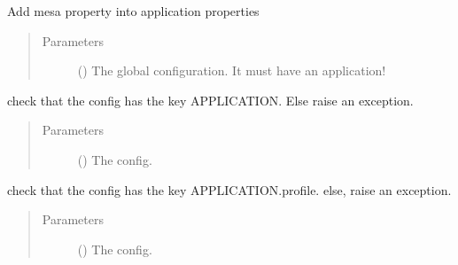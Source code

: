 \documentclass[a4paper,10pt,english]{sphinxmanual}
\begin{document}
\begin{fulllineitems}
\label{\detokenize{commands/apidoc/src:src.__init__.activate_mesa_property}}
Add mesa property into application properties
\begin{quote}\begin{description}
\item[{Parameters}] \leavevmode
{} () \textendash{} The global configuration. It must have an application!

\end{description}\end{quote}

\end{fulllineitems}


\begin{fulllineitems}
\label{\detokenize{commands/apidoc/src:src.__init__.check_config_has_application}}
check that the config has the key APPLICATION. Else raise an exception.
\begin{quote}\begin{description}
\item[{Parameters}] \leavevmode
{} () \textendash{} The config.

\end{description}\end{quote}

\end{fulllineitems}


\begin{fulllineitems}
\label{\detokenize{commands/apidoc/src:src.__init__.check_config_has_profile}}
check that the config has the key APPLICATION.profile.
else, raise an exception.
\begin{quote}\begin{description}
\item[{Parameters}] \leavevmode
{} () \textendash{} The config.

\end{description}\end{quote}

\end{fulllineitems}
\end{document}
